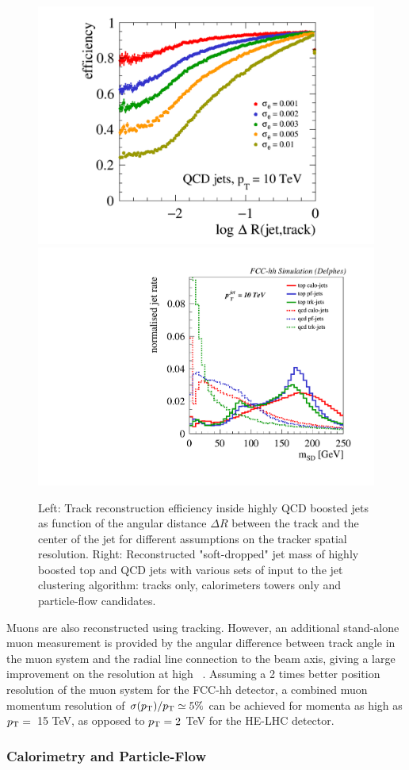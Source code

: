 \documentclass[a4paper,11pt]{article}
\begin{document}
\begin{figure}[htb!]
  \centering
  \includegraphics[width=0.56\columnwidth]{Fig/dtf.pdf}
  \includegraphics[width=0.42\columnwidth]{Fig/jetalgo.pdf}
  \caption{Left: Track reconstruction efficiency inside highly QCD boosted jets as function of the angular distance $\Delta R$ between the track and the center of the jet for different assumptions on the tracker spatial resolution. Right: Reconstructed 
  "soft-dropped" jet mass of highly boosted top and QCD jets with various sets of input to the jet clustering algorithm: tracks only, calorimeters towers only and particle-flow candidates. }
  \label{fig:substructure}
\end{figure}

Muons are also reconstructed using tracking. However, an additional stand-alone muon measurement is provided by the angular difference between track angle in the muon system and the radial line connection to the beam axis, giving a large improvement on the resolution at high \pt~\cite{cdr_volume3}. Assuming a 2 times better position resolution of the muon system for the FCC-hh detector, a combined muon momentum resolution of $\sigma(p_{\text{T}})/p_{\text{T}}  \simeq 5\%$ can be achieved for momenta as high as $p_{\text{T}}=$~15 TeV, as opposed to $p_{\text{T}}=2~$TeV for the HE-LHC detector.





\subsubsection{Calorimetry and Particle-Flow}
\label{appsub:calorimetry}
\end{document}
